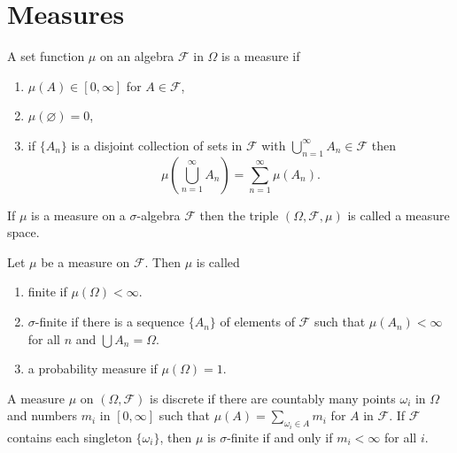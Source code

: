 \chapter{Measures}

\begin{definition}[Measure]
A set function $\mu$ on an algebra $\mathcal F$ in $\Omega$ is a measure if
\begin{enumerate}[label=\roman*.]
\item $\mu(A)\in[0,\infty]$ for $A\in \mathcal F$,
\item $\mu(\varnothing)=0$,
\item if $\{A_n\}$ is a disjoint collection of sets in $\mathcal F$ with 
	$\bigcup_{n=1}^\infty A_n\in \mathcal F$ then
	\begin{equation}
	\mu\left(\bigcup_{n=1}^\infty A_n\right)=\sum_{n=1}^{\infty}\mu(A_n).
	\end{equation}
\end{enumerate}
If $\mu$ is a measure on a $\sigma$-algebra $\mathcal F$ then the triple 
$(\Omega, \mathcal F, \mu)$ is called a measure space.
\end{definition}

\begin{definition}
Let $\mu$ be a measure on $\mathcal F$. Then $\mu$ is called
\begin{enumerate}[label=\roman*.]
\item finite if $\mu(\Omega)<\infty$.
\item $\sigma$-finite if there is a sequence $\{A_n\}$ of elements of $\mathcal F$
such that $\mu(A_n)<\infty$ for all $n$ and $\bigcup A_n=\Omega$.
\item a probability measure if $\mu(\Omega)=1$.
\end{enumerate}
\end{definition}

\begin{example}
A measure $\mu$ on $(\Omega, \mathcal F)$ is discrete if there are countably many points 
$\omega_i$ in $\Omega$ and numbers $m_i$ in $[0,\infty]$ such that $\mu(A)=\sum_{\omega_i\in A} m_i$
for $A$ in $\mathcal F$. If $\mathcal F$ contains each singleton $\{\omega_i \}$, then $\mu$
is $\sigma$-finite if and only if $m_i<\infty$ for all $i$.
\end{example}

